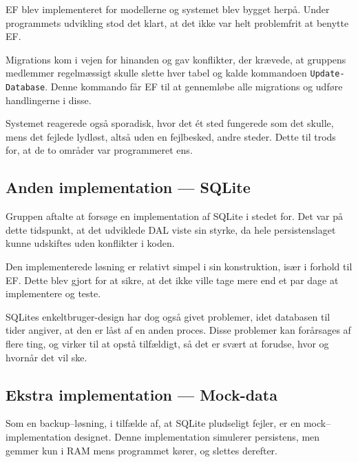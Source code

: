 \acl{EF} blev implementeret for modellerne og systemet blev bygget herpå.
Under programmets udvikling stod det klart, at det ikke var helt problemfrit at benytte \ac{EF}.

Migrations kom i vejen for hinanden og gav konflikter, der krævede, at gruppens medlemmer regelmæssigt skulle slette hver tabel og kalde kommandoen \texttt{Update-Database}.
Denne kommando får \ac{EF} til at gennemløbe alle migrations og udføre handlingerne i disse.

Systemet reagerede også sporadisk, hvor det ét sted fungerede som det skulle, mens det fejlede lydløst, altså uden en fejlbesked, andre steder.
Dette til trods for, at de to områder var programmeret ens.

\subsection{Anden implementation --- SQLite}

Gruppen aftalte at forsøge en implementation af SQLite i stedet for.
Det var på dette tidspunkt, at det udviklede \acl{DAL} viste sin styrke, da hele persistenslaget kunne udskiftes uden konflikter i koden.

Den implementerede løsning er relativt simpel i sin konstruktion, især i forhold til \acl{EF}.
Dette blev gjort for at sikre, at det ikke ville tage mere end et par dage at implementere og teste.

SQLites enkeltbruger-design har dog også givet problemer, idet databasen til tider angiver, at den er låst af en anden proces.
Disse problemer kan forårsages af flere ting, og virker til at opstå tilfældigt, så det er svært at forudse, hvor og hvornår det vil ske.

\subsection{Ekstra implementation --- Mock-data}

Som en backup--løsning, i tilfælde af, at SQLite pludseligt fejler, er en mock--implementation designet.
Denne implementation simulerer persistens, men gemmer kun i RAM mens programmet kører, og slettes derefter.



